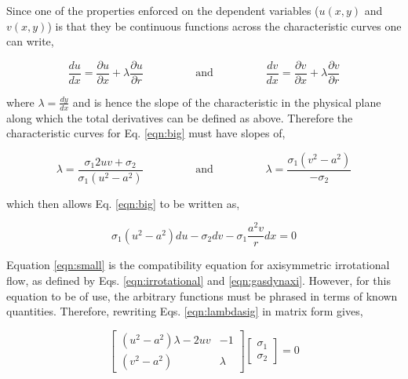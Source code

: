 	Since one of the properties enforced on the dependent variables ($u(x,y)$ and $v(x,y)$)  
is that they be continuous functions across the characteristic curves one can write,

\begin{displaymath}
	\frac{du}{dx} = \frac{\partial u}{\partial x} + \lambda\frac{\partial u}{\partial r}
	\hspace{2cm}\textrm{and}\hspace{2cm} \frac{dv}{dx} = \frac{\partial v}{\partial x} + 
	\lambda\frac{\partial v}{\partial r}
\end{displaymath}

	where $\lambda = \frac{dy}{dx}$ and is hence the slope of the characteristic in the
physical plane along which the total derivatives can be defined as above.  Therefore the 
characteristic curves for Eq. \ref{eqn:big} must have slopes of,

\begin{equation}
	\lambda = \frac{\sigma_1 2uv + \sigma_2}{\sigma_1(u^2-a^2)} \hspace{2cm}\textrm{and}\hspace{2cm}
	\lambda = \frac{\sigma_1(v^2-a^2)}{-\sigma_2}
\label{eqn:lambdasig}
\end{equation}

	which then allows Eq. \ref{eqn:big} to be written as,

\begin{equation}
	\sigma_1(u^2-a^2)du - \sigma_2 dv - \sigma_1\frac{a^2v}{r}dx = 0
\label{eqn:small}
\end{equation}

	Equation \ref{eqn:small} is the compatibility equation for axisymmetric irrotational flow,
as defined by Eqs. \ref{eqn:irrotational} and \ref{eqn:gasdynaxi}.  However, for this equation to 
be of use, the arbitrary functions must be phrased in terms of known quantities.  Therefore,
rewriting Eqs. \ref{eqn:lambdasig} in matrix form gives,

\begin{displaymath}
	\left[\begin{array}{cc}
	(u^2-a^2)\lambda - 2uv & -1 \\ (v^2-a^2) & \lambda
	\end{array}\right] 
	\left[\begin{array}{c}
	\sigma_1 \\ \sigma_2
	\end{array}\right] = 0 
\end{displaymath}

